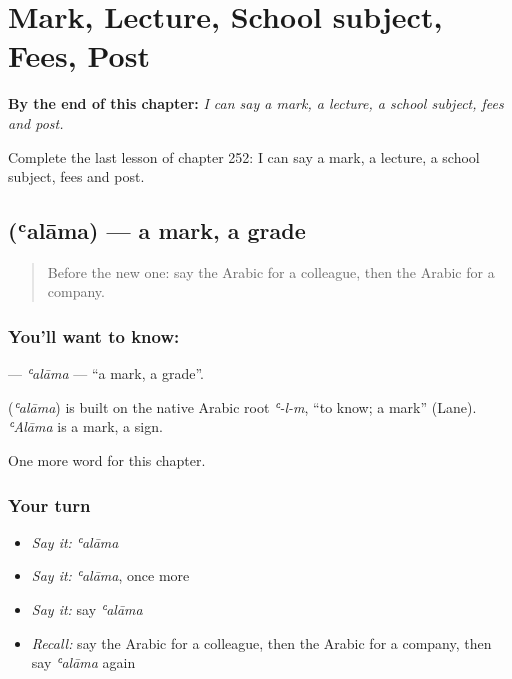
\chapter{Mark, Lecture, School subject, Fees, Post}
\label{ch:ar-mark-lecture-school-subject-fees-post}

\begin{chapteropening}
\textbf{By the end of this chapter:} \emph{I can say a mark, a lecture, a school subject, fees and post.}

Complete the last lesson of chapter 252: I can say a mark, a lecture, a school subject, fees and post.
\end{chapteropening}

\section[\texorpdfstring{\ar{علامة} (ʿalāma)}{علامة (ʿalāma)}]{ (ʿalāma) — a mark, a grade}

\label{lesson:AR-C252-alama}



\begin{quote}
Before the new one: say the Arabic for a colleague, then the Arabic for a company.
\end{quote}

\subsection*{You'll want to know: }
\textbf{} — \emph{ʿalāma} — \textquotedblleft{}a mark, a grade\textquotedblright{}.

\begin{cousinweb}
\textbf{} (\emph{ʿalāma}) is built on the native Arabic root \emph{ʿ-l-m}, \textquotedblleft{}to know; a mark\textquotedblright{} (Lane). \emph{ʿAlāma} is a mark, a sign.
\end{cousinweb}

\begin{grammarlens}[title={What you've built}]
One more word for this chapter.
\end{grammarlens}

\subsection*{Your turn}
\begin{itemize}
\raggedright
  \item \emph{Say it:} \emph{ʿalāma}
  \item \emph{Say it:} \emph{ʿalāma}, once more
  \item \emph{Say it:} say \emph{ʿalāma}
  \item \emph{Recall:} say the Arabic for a colleague, then the Arabic for a company, then say \emph{ʿalāma} again
\end{itemize}

